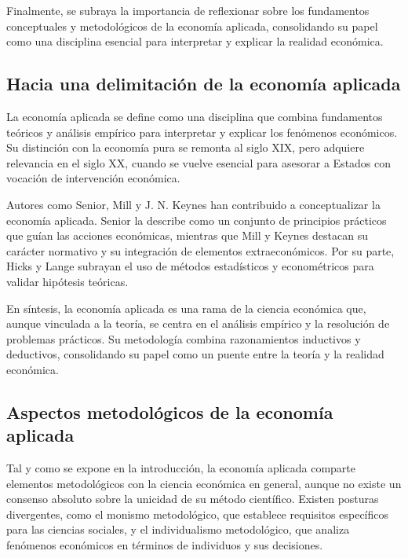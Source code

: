\documentclass[12pt]{book} %
\begin{document}
Finalmente, se subraya la importancia de reflexionar sobre los
fundamentos conceptuales y metodológicos de la economía aplicada,
consolidando su papel como una disciplina esencial para interpretar y
explicar la realidad económica.

\hypertarget{hacia-una-delimitaciuxf3n-de-la-economuxeda-aplicada}{%
\subsection{Hacia una delimitación de la economía
aplicada}\label{hacia-una-delimitaciuxf3n-de-la-economuxeda-aplicada}}

La economía aplicada se define como una disciplina que combina
fundamentos teóricos y análisis empírico para interpretar y explicar los
fenómenos económicos. Su distinción con la economía pura se remonta al
siglo XIX, pero adquiere relevancia en el siglo XX, cuando se vuelve
esencial para asesorar a Estados con vocación de intervención económica.

Autores como Senior, Mill y J. N. Keynes han contribuido a
conceptualizar la economía aplicada. Senior la describe como un conjunto
de principios prácticos que guían las acciones económicas, mientras que
Mill y Keynes destacan su carácter normativo y su integración de
elementos extraeconómicos. Por su parte, Hicks y Lange subrayan el uso
de métodos estadísticos y econométricos para validar hipótesis teóricas.

En síntesis, la economía aplicada es una rama de la ciencia económica
que, aunque vinculada a la teoría, se centra en el análisis empírico y
la resolución de problemas prácticos. Su metodología combina
razonamientos inductivos y deductivos, consolidando su papel como un
puente entre la teoría y la realidad económica.

\hypertarget{aspectos-metodoluxf3gicos-de-la-economuxeda-aplicada}{%
\subsection{Aspectos metodológicos de la economía
aplicada}\label{aspectos-metodoluxf3gicos-de-la-economuxeda-aplicada}}

Tal y como se expone en la introducción, la economía aplicada comparte
elementos metodológicos con la ciencia económica en general, aunque no
existe un consenso absoluto sobre la unicidad de su método científico.
Existen posturas divergentes, como el monismo metodológico, que
establece requisitos específicos para las ciencias sociales, y el
individualismo metodológico, que analiza fenómenos económicos en
términos de individuos y sus decisiones.
\end{document}

